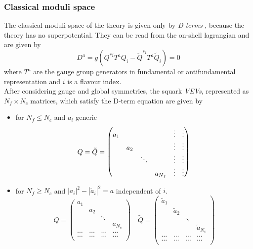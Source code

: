 \subsubsection{Classical moduli space}
The classical moduli space of the theory is given only by \emph{D-terms} , because the theory has no superpotential. 
They can be read from the on-shell lagrangian and are given by
\begin{equation}
 D^a = g \left( Q^{*i} T^a Q_i - \tilde{Q}^{* i} T^a \tilde{Q}_i \right) = 0
\end{equation}
where $T^a$ are the gauge group generators in fundamental or antifundamental representation and $i$ is a flavour index.
\\
After considering gauge and global symmetries, the squark \emph{VEVs}, represented as $N_f \times N_c$ matrices, which satisfy the D-term equation are given by
\begin{itemize}
\item for $N_f \le N_c$ and $a_i$ generic
\begin{equation}
Q = \tilde{Q} = 
\begin{pmatrix}
 a_1 & 		&	 &	 & \vdots & \vdots \\
	 & a_2  & 	 & 	 & \vdots & \vdots \\  	
 	 & 		&	\ddots &	 &\vdots & \vdots  \\
	 &  & 	 & 	a_{N_f}  & \vdots & \vdots
\end{pmatrix} 
 \\
\end{equation}
\item for $N_f \geq N_c$ and $ | a_i|^2 - | \tilde{a}_i |^2 = a $ independent of $i$.
\begin{equation}
Q  = 
\begin{pmatrix} 
	 a_1 & 		&	 &	  \\
	 & a_2  & 	 & 	 \\  	
 	 & 		&	\ddots &	   \\
	 &  & 	 & 	a_{N_c}  \\
	 \dots & \dots & \dots & \dots\\ 
	 \dots & \dots & \dots & \dots\\ 
\end{pmatrix} 
\quad
\tilde{Q} = 
\begin{pmatrix}
 \tilde{a}_1 & 		&	 &	  \\
	 & \tilde{a}_2  & 	 & 	 \\  	
 	 & 		&	\ddots &	   \\
	 &  & 	 & 	\tilde{a}_{N_c}  \\
	 \dots & \dots & \dots & \dots\\ 
	 \dots & \dots & \dots & \dots\\ 
\end{pmatrix} 
\end{equation}
\end{itemize}
